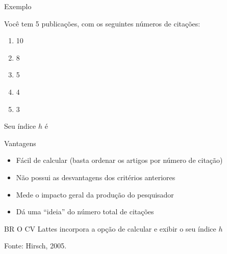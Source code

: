 \documentclass{beamer}
\begin{document}
\begin{frame}{Exemplo}
  \begin{exampleblock}{}
    \footnotesize

    Você tem 5 publicações, com os seguintes números de citações:
    \bigskip
    \begin{enumerate}
      \tiny
    \item 10
    \item 8
    \item 5
    \item \alert<2->{4}
    \item 3
    \end{enumerate}

    \bigskip
    \begin{exampleblock}{}
      \small
      \begin{center}
        Seu índice $h$ é 
      \end{center}
    \end{exampleblock}

    \bigskip
  \end{exampleblock}
\end{frame}

\begin{frame}{Vantagens}
  \begin{itemize}
    \footnotesize
  \item Fácil de calcular (basta ordenar os artigos por número de citação)
  \bigskip
  \item Não possui as desvantagens dos critérios anteriores
  \bigskip
  \item Mede o impacto geral da produção do pesquisador
  \bigskip
  \item Dá uma ``ideia'' do número total de citações
  \end{itemize}
  \bigskip
  \begin{block}{BR}
    \footnotesize
    O CV Lattes incorpora a opção de calcular e exibir o seu índice $h$
  \end{block}
  \vfill
  \footnotesize
  \hfill Fonte: Hirsch, 2005.
\end{frame}

\end{document}
